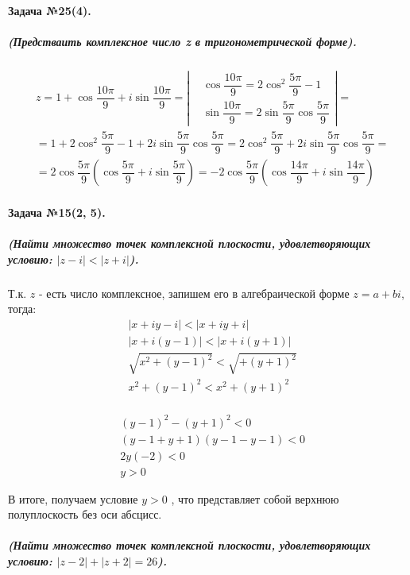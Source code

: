\documentclass[a4paper,12pt]{report}
\begin{document}
\paragraph{Задача №25(4).}
\subparagraph{(Предстваить комплексное число z в тригонометрической форме).}

\begin{align*}
	&z=1+\cos{\dfrac{10\pi}{9}}+i\sin{\dfrac{10\pi}{9}}=
	\left|
		\begin{aligned}
			&\cos{\dfrac{10\pi}{9}}=2\cos^2{\dfrac{5\pi}{9}}-1\\
			&\sin{\dfrac{10\pi}{9}}=
			2\sin{\dfrac{5\pi}{9}}\cos{\dfrac{5\pi}{9}}
		\end{aligned}
	\right|=\\
	&=1+2\cos^2{\dfrac{5\pi}{9}}-1+
	2i\sin{\dfrac{5\pi}{9}}\cos{\dfrac{5\pi}{9}}=
	2\cos^2{\dfrac{5\pi}{9}}+
	2i\sin{\dfrac{5\pi}{9}}\cos{\dfrac{5\pi}{9}}=\\
	&=2\cos{\dfrac{5\pi}{9}}
	\left(
		\cos{\dfrac{5\pi}{9}}+i\sin{\dfrac{5\pi}{9}}
	\right)=
	-2\cos{\dfrac{5\pi}{9}}
	\left(
	\cos{\dfrac{14\pi}{9}}+i\sin{\dfrac{14\pi}{9}}
	\right)
\end{align*}
 
\paragraph{Задача №15(2, 5).}
\subparagraph{(Найти множество точек комплексной плоскости, 
	удовлетворяющих условию: $ |z-i|<|z+i| $).} 
Т.к. $ z $ - есть число комплексное, запишем его в алгебраической форме
$ z=a+bi $, тогда:
\begin{align*}
	&|x+iy-i|<|x+iy+i|\\
	&|x+i(y-1)|<|x+i(y+1)|\\
	&\sqrt{x^2+(y-1)^2}<\sqrt{+(y+1)^2}\\
	&x^2+(y-1)^2<x^2+(y+1)^2\\
\end{align*}

\begin{align*}
	&(y-1)^2-(y+1)^2<0\\
	&(y-1+y+1)(y-1-y-1)<0\\
	&2y(-2)<0\\
	&y>0	
\end{align*}

В итоге, получаем условие $ y>0 $ , что представляет собой верхнюю
полуплоскость без оси абсцисс.

\subparagraph{(Найти множество точек комплексной плоскости, 
	удовлетворяющих условию: $ |z-2|+|z+2|=26 $).\\\\}
\end{document}
